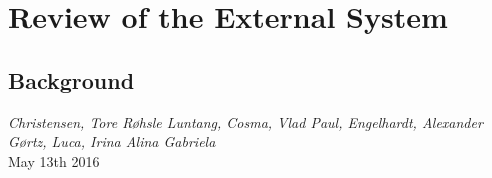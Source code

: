 \section{Review of the External System}

\subsection{Background}

 {\it Christensen, Tore Røhsle Luntang, Cosma, Vlad Paul, Engelhardt, Alexander Gørtz,  Luca, Irina Alina Gabriela} \\

 May 13th 2016

